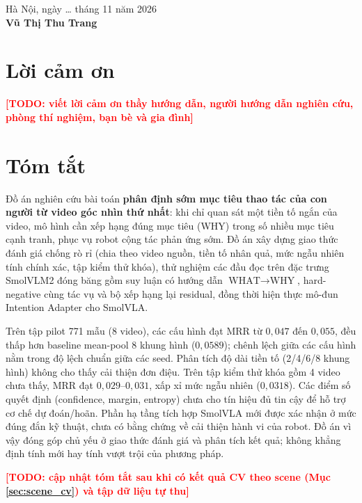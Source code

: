 \documentclass[12pt,a4paper]{report}
\newcommand{\TODO}[1]{\textcolor{red}{\textbf{[TODO: #1]}}}
\newcommand{\StudentName}{Vũ Thị Thu Trang}
\newcommand{\ThesisYear}{2026}
\begin{document}
\vspace{1cm}
\begin{flushright}
Hà Nội, ngày \ldots{} tháng 11 năm \ThesisYear\\[0.2cm]
\textbf{\StudentName}
\end{flushright}

\chapter*{Lời cảm ơn}

\TODO{viết lời cảm ơn thầy hướng dẫn, người hướng dẫn nghiên cứu, phòng thí nghiệm, bạn bè và gia đình}

\chapter*{Tóm tắt}

Đồ án nghiên cứu bài toán \textbf{phân định sớm mục tiêu thao tác của con người từ video góc nhìn thứ nhất}: khi chỉ quan sát một tiền tố ngắn của video, mô hình cần xếp hạng đúng mục tiêu (WHY) trong số nhiều mục tiêu cạnh tranh, phục vụ robot cộng tác phản ứng sớm. Đồ án xây dựng giao thức đánh giá chống rò rỉ (chia theo video nguồn, tiền tố nhân quả, mức ngẫu nhiên tính chính xác, tập kiểm thử khóa), thử nghiệm các đầu đọc trên đặc trưng SmolVLM2 đóng băng gồm suy luận có hướng dẫn $\text{WHAT}\to\text{WHY}$, hard-negative cùng tác vụ và bộ xếp hạng lại residual, đồng thời hiện thực mô-đun Intention Adapter cho SmolVLA.

Trên tập pilot 771 mẫu (8 video), các cấu hình đạt MRR từ $0{,}047$ đến $0{,}055$, đều thấp hơn baseline mean-pool 8 khung hình ($0{,}0589$); chênh lệch giữa các cấu hình nằm trong độ lệch chuẩn giữa các seed. Phân tích độ dài tiền tố (2/4/6/8 khung hình) không cho thấy cải thiện đơn điệu. Trên tập kiểm thử khóa gồm 4 video chưa thấy, MRR đạt $0{,}029$--$0{,}031$, xấp xỉ mức ngẫu nhiên ($0{,}0318$). Các điểm số quyết định (confidence, margin, entropy) chưa cho tín hiệu đủ tin cậy để hỗ trợ cơ chế dự đoán/hoãn. Phần hạ tầng tích hợp SmolVLA mới được xác nhận ở mức đúng đắn kỹ thuật, chưa có bằng chứng về cải thiện hành vi của robot. Đồ án vì vậy đóng góp chủ yếu ở giao thức đánh giá và phân tích kết quả; không khẳng định tính mới hay tính vượt trội của phương pháp.

\TODO{cập nhật tóm tắt sau khi có kết quả CV theo scene (Mục \ref{sec:scene_cv}) và tập dữ liệu tự thu}
\end{document}
